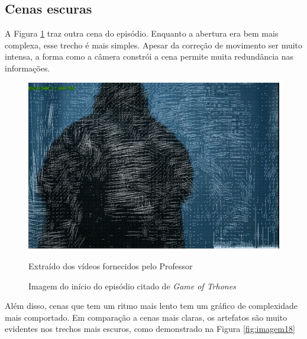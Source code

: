 \subsection{Cenas escuras}
A Figura \ref{fig:imagem17} traz outra cena do episódio. Enquanto a abertura era bem mais complexa, esse trecho é mais simples. Apesar da correção de movimento ser muito intensa, a forma como a câmera constrói a cena permite muita redundância nas informações.

\begin{figure}[H]
    \centering
    \caption{Imagem do início do episódio citado de \textit{Game of Trhones}}
    \label{fig:imagem17}
    
    \includegraphics[scale=0.35]{Documeto/1-ElementosTextuais/images/17.png}

    \small
    Extraído dos vídeos fornecidos pelo Professor
\end{figure}

\paragrafo Além disso, cenas que tem um ritmo mais lento tem um gráfico de complexidade mais comportado. Em comparação a cenas mais claras, os artefatos são muito evidentes nos trechos mais escuros, como demonstrado na Figura \ref{fig:imagem18}

